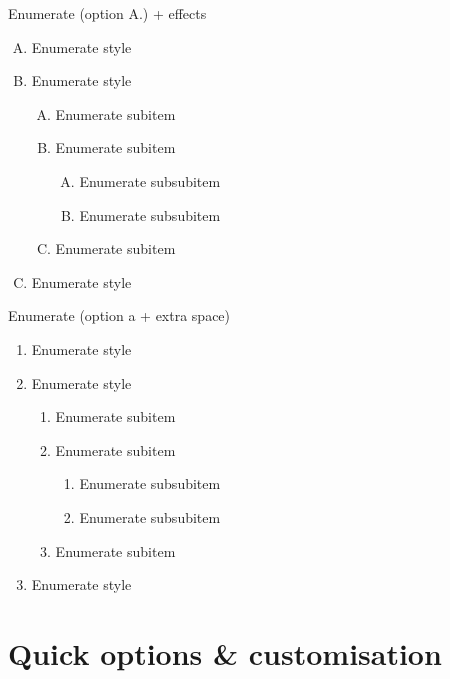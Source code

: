 \documentclass[10pt,t]{beamer}
\begin{document}
\begin{frame}{Enumerate}
(option A.) + effects
\begin{enumerate}[A.]
	\item<1-5> Enumerate style
	\item<1-5> Enumerate style
	\begin{enumerate}[A.]
		\item<2-5> Enumerate subitem
		\item<3-5> Enumerate subitem
		\begin{enumerate}[A.]
			\item<3-4> Enumerate subsubitem
			\item<3-4> Enumerate subsubitem
		\end{enumerate}
		\item<4-5> Enumerate subitem
	\end{enumerate}
	\item<5> Enumerate style
\end{enumerate}
\end{frame}




\begin{frame}{Enumerate}
(option a + extra space)
\begin{enumerate}[a\enspace]
	\item Enumerate style
	\item Enumerate style
	\begin{enumerate}[a\enspace]
		\item Enumerate subitem
		\item Enumerate subitem
		\begin{enumerate}[a\enspace]
			\item Enumerate subsubitem
			\item Enumerate subsubitem
		\end{enumerate}
		\item Enumerate subitem
	\end{enumerate}
	\item Enumerate style
\end{enumerate}
\end{frame}







\section{Quick options \& customisation}
\end{document}
